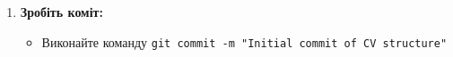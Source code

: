\documentclass[12pt, a4paper]{article}
\begin{document}
\begin{enumerate}
\begin{itemize}
			\item Вимоги:
				\begin{itemize}
					\item Використовуйте семантичні теги HTML.
					\item Використовуйте заголовки, параграфи, списки та посилання.
					\item НЕ використовуйте CSS або JavaScript на цьому етапі. Зосередьтеся виключно на структурі.
				\end{itemize}
		\end{itemize}
	\item \textbf{Зробіть коміт:}
		\begin{itemize}
			\item Виконайте команду \verb|git commit -m "Initial commit of CV structure"|
		\end{itemize}
\end{enumerate}
\end{document}
